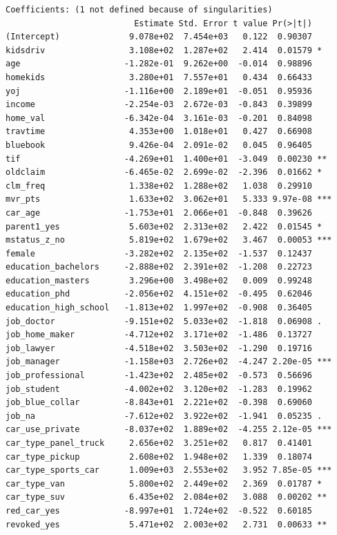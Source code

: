 \documentclass[
  11pt]{article}
\begin{document}
\begin{verbatim}
Coefficients: (1 not defined because of singularities)
                          Estimate Std. Error t value Pr(>|t|)    
(Intercept)              9.078e+02  7.454e+03   0.122  0.90307    
kidsdriv                 3.108e+02  1.287e+02   2.414  0.01579 *  
age                     -1.282e-01  9.262e+00  -0.014  0.98896    
homekids                 3.280e+01  7.557e+01   0.434  0.66433    
yoj                     -1.116e+00  2.189e+01  -0.051  0.95936    
income                  -2.254e-03  2.672e-03  -0.843  0.39899    
home_val                -6.342e-04  3.161e-03  -0.201  0.84098    
travtime                 4.353e+00  1.018e+01   0.427  0.66908    
bluebook                 9.426e-04  2.091e-02   0.045  0.96405    
tif                     -4.269e+01  1.400e+01  -3.049  0.00230 ** 
oldclaim                -6.465e-02  2.699e-02  -2.396  0.01662 *  
clm_freq                 1.338e+02  1.288e+02   1.038  0.29910    
mvr_pts                  1.633e+02  3.062e+01   5.333 9.97e-08 ***
car_age                 -1.753e+01  2.066e+01  -0.848  0.39626    
parent1_yes              5.603e+02  2.313e+02   2.422  0.01545 *  
mstatus_z_no             5.819e+02  1.679e+02   3.467  0.00053 ***
female                  -3.282e+02  2.135e+02  -1.537  0.12437    
education_bachelors     -2.888e+02  2.391e+02  -1.208  0.22723    
education_masters        3.296e+00  3.498e+02   0.009  0.99248    
education_phd           -2.056e+02  4.151e+02  -0.495  0.62046    
education_high_school   -1.813e+02  1.997e+02  -0.908  0.36405    
job_doctor              -9.151e+02  5.033e+02  -1.818  0.06908 .  
job_home_maker          -4.712e+02  3.171e+02  -1.486  0.13727    
job_lawyer              -4.518e+02  3.503e+02  -1.290  0.19716    
job_manager             -1.158e+03  2.726e+02  -4.247 2.20e-05 ***
job_professional        -1.423e+02  2.485e+02  -0.573  0.56696    
job_student             -4.002e+02  3.120e+02  -1.283  0.19962    
job_blue_collar         -8.843e+01  2.221e+02  -0.398  0.69060    
job_na                  -7.612e+02  3.922e+02  -1.941  0.05235 .  
car_use_private         -8.037e+02  1.889e+02  -4.255 2.12e-05 ***
car_type_panel_truck     2.656e+02  3.251e+02   0.817  0.41401    
car_type_pickup          2.608e+02  1.948e+02   1.339  0.18074    
car_type_sports_car      1.009e+03  2.553e+02   3.952 7.85e-05 ***
car_type_van             5.800e+02  2.449e+02   2.369  0.01787 *  
car_type_suv             6.435e+02  2.084e+02   3.088  0.00202 ** 
red_car_yes             -8.997e+01  1.724e+02  -0.522  0.60185    
revoked_yes              5.471e+02  2.003e+02   2.731  0.00633 ** 

\end{verbatim}
\end{document}
